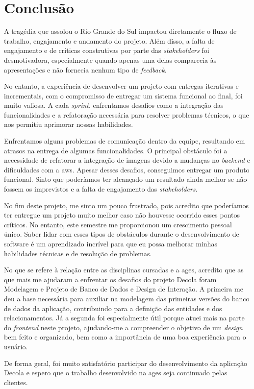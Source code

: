 \section[Conclusão]{Conclusão}

A tragédia que assolou o Rio Grande do Sul impactou diretamente o fluxo de trabalho, engajamento e andamento do projeto. Além disso, a falta de engajamento e de críticas construtivas por parte das \textit{stakeholders} foi desmotivadora, especialmente quando apenas uma delas comparecia às apresentações e não fornecia nenhum tipo de \textit{feedback}.

No entanto, a experiência de desenvolver um projeto com entregas iterativas e incrementais, com o compromisso de entregar um sistema funcional ao final, foi muito valiosa. A cada \textit{sprint}, enfrentamos desafios como a integração das funcionalidades e a refatoração necessária para resolver problemas técnicos, o que nos permitiu aprimorar nossas habilidades.

Enfrentamos alguns problemas de comunicação dentro da equipe, resultando em atrasos na entrega de algumas funcionalidades. O principal obstáculo foi a necessidade de refatorar a integração de imagens devido a mudanças no \textit{backend} e dificuldades com a \ac{aws}. Apesar desses desafios, conseguimos entregar um produto funcional. Sinto que poderíamos ter alcançado um resultado ainda melhor se não fossem os imprevistos e a falta de engajamento das \textit{stakeholders}.

No fim deste projeto, me sinto um pouco frustrado, pois acredito que poderíamos ter entregue um projeto muito melhor caso não houvesse ocorrido esses pontos críticos. No entanto, este semestre me proporcionou um crescimento pessoal único. Saber lidar com esses tipos de obstáculos durante o desenvolvimento de software é um aprendizado incrível para que eu possa melhorar minhas habilidades técnicas e de resolução de problemas.

No que se refere à relação entre as disciplinas cursadas e a \ac{ages}, acredito que as que mais me ajudaram a enfrentar os desafios do projeto Decola foram Modelagem e Projeto de Banco de Dados e Design de Interação. A primeira me deu a base necessária para auxiliar na modelagem das primeiras versões do banco de dados da aplicação, contribuindo para a definição das entidades e dos relacionamentos. Já a segunda foi especialmente útil porque atuei mais na parte do \textit{frontend} neste projeto, ajudando-me a compreender o objetivo de um \textit{design} bem feito e organizado, bem como a importância de uma boa experiência para o usuário.

De forma geral, foi muito satisfatório participar do desenvolvimento da aplicação Decola e espero que o trabalho desenvolvido na \ac{ages} seja continuado pelas clientes.